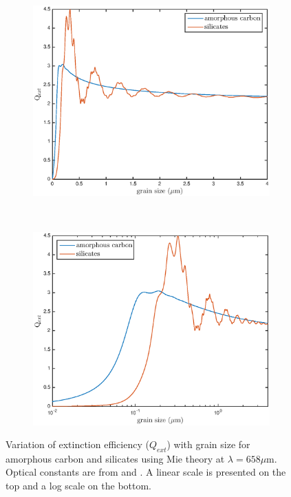 \begin{figure}

\begin{subfigure}{1\textwidth}
\centering
\includegraphics[trim =37 10 45 15,clip=true,scale=0.75]{chapters/chapter4/images/Qext_grainsize_upto4}
\end{subfigure}\\[1ex]
\begin{subfigure}{\textwidth}
\centering
\includegraphics[trim =35 10 45 15,clip=true,scale=0.75]{chapters/chapter4/images/Qext_grainsize_upto4_log}
\end{subfigure}
\caption{Variation of extinction efficiency ($Q_{ext}$) with grain size for amorphous carbon and silicates using Mie theory at $\lambda = 658 \mu $m. Optical constants are from \citet{Zubko1996} and \citet{Draine1984}. A linear scale is presented on the top and a log scale on the bottom.}
\label{Qext_grain}
\end{figure}

